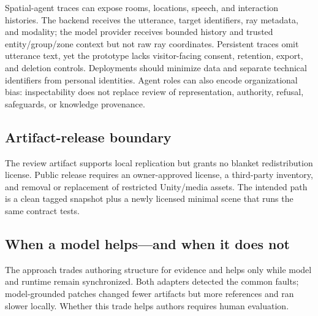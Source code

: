 Spatial-agent traces can expose rooms, locations, speech, and interaction
histories. The backend receives the utterance, target identifiers, ray
metadata, and modality; the model provider receives bounded history and trusted
entity/group/zone context but not raw ray coordinates. Persistent traces omit
utterance text, yet the prototype lacks visitor-facing consent, retention,
export, and deletion controls. Deployments should minimize data and separate
technical identifiers from personal identities. Agent roles can also encode
organizational bias: inspectability does not replace review of representation,
authority, refusal, safeguards, or knowledge provenance.

\subsection{Artifact-release boundary}

The review artifact supports local replication but grants no blanket
redistribution license. Public release requires an owner-approved license, a
third-party inventory, and removal or replacement of restricted Unity/media
assets. The intended path is a clean tagged snapshot plus a newly licensed
minimal scene that runs the same contract tests.

\subsection{When a model helps---and when it does not}

The approach trades authoring structure for evidence and helps only while model
and runtime remain synchronized. Both adapters detected the common faults;
model-grounded patches changed fewer artifacts but more references and ran
slower locally. Whether this trade helps authors requires human evaluation.
